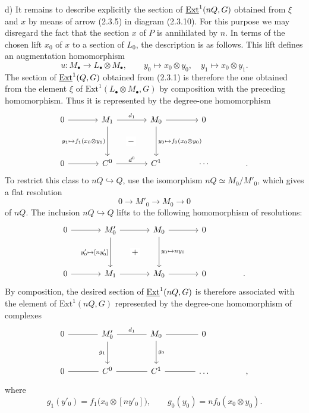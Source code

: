 \medskip
\noindent d) It remains to describe explicitly the section of
$\uExt^1(nQ,G)$ obtained from $\xi$ and $x$ by means of arrow (2.3.5)
in diagram (2.3.10).  For this purpose we may disregard the fact that
the section $x$ of $P$ is annihilated by $n$.  In terms of the chosen
lift $x_0$ of $x$ to a section of $L_0$, the description is as follows.
This lift defines an augmentation homomorphism
\[
 u:M_\bullet\longrightarrow L_\bullet\otimes M_\bullet,
 \qquad
 y_0\longmapsto x_0\otimes y_0,
 \quad
 y_1\longmapsto x_0\otimes y_1.
\]
The section of $\uExt^1(Q,G)$ obtained from (2.3.1) is therefore the
one obtained from the element $\xi$ of
$\mathrm{Ext}^1(L_\bullet\otimes M_\bullet,G)$ by composition with
the preceding homomorphism.  Thus it is represented by the
degree-one homomorphism
\[
\begin{tikzcd}[column sep=large,row sep=huge]
 0\arrow[r]&M_1\arrow[r,"d_1"]
   \arrow[d,"{y_1\mapsto f_1(x_0\otimes y_1)}"']
   \arrow[rd,phantom,"-" description]
   &M_0\arrow[r]\arrow[d,"{y_0\mapsto f_0(x_0\otimes y_0)}"]&0\\
 0\arrow[r]&C^0\arrow[r,"d^0"]&C^1&\cdots&{.}
\end{tikzcd}
\]
To restrict this class to $nQ\hookrightarrow Q$, use the isomorphism
$nQ\simeq M_0/M'_0$, which gives a flat resolution
\[
 0\longrightarrow M'_0\longrightarrow M_0\longrightarrow0
\]
of $nQ$.  The inclusion $nQ\hookrightarrow Q$ lifts to the following
homomorphism of resolutions:
\[
\begin{tikzcd}[column sep=large,row sep=huge]
 0\arrow[r]&M'_0\arrow[r]
   \arrow[d,"{y'_0\mapsto[ny'_0]}"']
   \arrow[rd,phantom,"+" description]
   &M_0\arrow[r]\arrow[d,"{y_0\mapsto ny_0}"]&0\\
 0\arrow[r]&M_1\arrow[r]&M_0\arrow[r]&0&{.}
\end{tikzcd}
\]
By composition, the desired section of $\uExt^1(nQ,G)$ is therefore
associated with the element of $\mathrm{Ext}^1(nQ,G)$ represented by
the degree-one homomorphism of complexes
\[
\begin{tikzcd}[column sep=large,row sep=large]
 0\arrow[r,dash]&M'_0\arrow[r,dash,"d_1"]\arrow[d,"g_1"']
   &M_0\arrow[r,dash]\arrow[d,"g_0"]&0&{}\\
 0\arrow[r,dash]&C^0\arrow[r,dash]&C^1\arrow[r,dash]&\dots&{,}
\end{tikzcd}
\]
where
\[
 g_1(y'_0)=f_1\bigl(x_0\otimes[ny'_0]\bigr),
 \qquad
 g_0(y_0)=n f_0(x_0\otimes y_0).
\]

